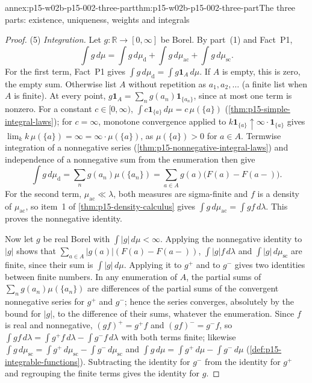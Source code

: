 \begin{annexitem}{annex:p15-w02b-p15-002-three-part}{thm:p15-w02b-p15-002-three-part}{The three parts: existence, uniqueness, weights and integrals}
\begin{proof}
(5) \emph{Integration.} Let \(g:\mathbb R\to[0,\infty]\) be Borel. By
part~(1) and Fact~P1,
\[
 \int g\,d\mu=\int g\,d\mu_{\mathrm d}+\int g\,d\mu_{\mathrm{ac}}
              +\int g\,d\mu_{\mathrm{sc}} .
\]
For the first term, Fact~P1 gives
\(\int g\,d\mu_{\mathrm d}=\int g\mathbf1_A\,d\mu\). If \(A\) is empty,
this is zero, the empty sum. Otherwise list \(A\) without repetition as
\(a_1,a_2,\ldots\) (a finite list when \(A\) is finite). At every point,
\(g\mathbf1_A=\sum_ng(a_n)\mathbf1_{\{a_n\}}\), since at most one term
is nonzero. For a constant \(c\in[0,\infty)\),
\(\int c\mathbf1_{\{a\}}\,d\mu=c\,\mu(\{a\})\)
(\cref{thm:p15-simple-integral-laws}); for \(c=\infty\), monotone
convergence applied to \(k\mathbf1_{\{a\}}\uparrow\infty\cdot\mathbf1_{\{a\}}\)
gives \(\lim_kk\,\mu(\{a\})=\infty=\infty\cdot\mu(\{a\})\), as
\(\mu(\{a\})>0\) for \(a\in A\). Termwise integration of a nonnegative
series (\cref{thm:p15-nonnegative-integral-laws}) and independence of a
nonnegative sum from the enumeration then give
\[
 \int g\,d\mu_{\mathrm d}=\sum_ng(a_n)\mu(\{a_n\})
     =\sum_{a\in A}g(a)\bigl(F(a)-F(a-)\bigr).
\]
For the second term, \(\mu_{\mathrm{ac}}\ll\lambda\), both measures are
sigma-finite and \(f\) is a density of \(\mu_{\mathrm{ac}}\), so item~1
of \cref{thm:p15-density-calculus} gives
\(\int g\,d\mu_{\mathrm{ac}}=\int gf\,d\lambda\). This proves the
nonnegative identity.

Now let \(g\) be real Borel with \(\int|g|\,d\mu<\infty\). Applying the
nonnegative identity to \(|g|\) shows that
\(\sum_{a\in A}|g(a)|(F(a)-F(a-))\), \(\int|g|f\,d\lambda\) and
\(\int|g|\,d\mu_{\mathrm{sc}}\) are finite, since their sum is
\(\int|g|\,d\mu\). Applying it to \(g^+\) and to \(g^-\) gives two
identities between finite numbers. In any enumeration of \(A\), the
partial sums of \(\sum_ng(a_n)\mu(\{a_n\})\) are differences of the
partial sums of the convergent nonnegative series for \(g^+\) and
\(g^-\); hence the series converges, absolutely by the bound for \(|g|\),
to the difference of their sums, whatever the enumeration. Since \(f\) is
real and nonnegative, \((gf)^+=g^+f\) and \((gf)^-=g^-f\), so
\(\int gf\,d\lambda=\int g^+f\,d\lambda-\int g^-f\,d\lambda\) with both
terms finite; likewise
\(\int g\,d\mu_{\mathrm{sc}}=\int g^+\,d\mu_{\mathrm{sc}}
-\int g^-\,d\mu_{\mathrm{sc}}\) and
\(\int g\,d\mu=\int g^+\,d\mu-\int g^-\,d\mu\)
(\cref{def:p15-integrable-functions}). Subtracting the identity for
\(g^-\) from the identity for \(g^+\) and regrouping the finite terms
gives the identity for \(g\).
\end{proof}
\end{annexitem}


